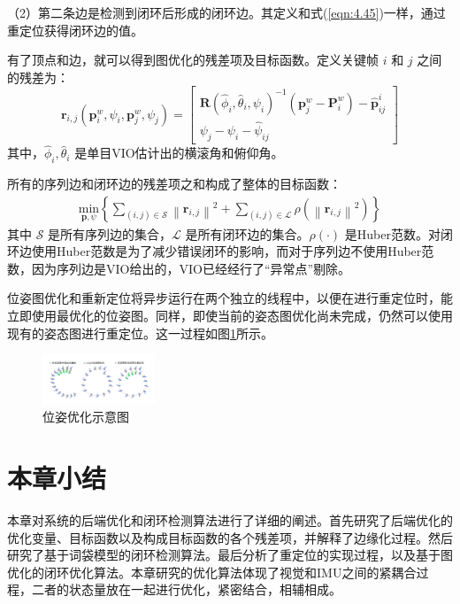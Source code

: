（2）第二条边是检测到闭环后形成的闭环边。其定义和式(\ref{eqn:4.45})一样，通过重定位获得闭环边的值。

有了顶点和边，就可以得到图优化的残差项及目标函数。定义关键帧 $i$ 和 $j$ 之间的残差为：
\begin{equation}
\label{eqn:4.46}
\mathbf{r}_{i,j}(\mathbf{p}_i^w,\psi_i,\mathbf{p}_j^w,\psi_j)=\begin{bmatrix}
\mathbf{R}(\hat{\phi}_i,\hat{\theta}_i,\psi_i)^{-1}(\mathbf{p}_j^w-\mathbf{P}_i^w)-\hat{\mathbf{p}}_{ij}^i \\
\psi_j-\psi_i-\hat{\psi}_{ij}
\end{bmatrix}
\end{equation}
其中，$\hat{\phi}_i,\hat{\theta}_i $ 是单目VIO估计出的横滚角和俯仰角。

所有的序列边和闭环边的残差项之和构成了整体的目标函数：
\begin{equation}
\label{eqn:4.47}
\begin{split}
\underset{\mathcal{\mathbf{p},\psi}}{\text{min}}
\left\{
\sum_{(i,j)\in\mathcal{S}}\left\| \mathbf{r}_{i,j} \right\|^2+\sum_{(i,j)\in\mathcal{L}}\rho(\left\| \mathbf{r}_{i,j} \right\|^2)
\right\}
\end{split}
\end{equation}
其中 $\mathcal{S} $ 是所有序列边的集合，$\mathcal{L} $ 是所有闭环边的集合。$\rho(\cdot) $  是Huber范数。对闭环边使用Huber范数是为了减少错误闭环的影响，而对于序列边不使用Huber范数，因为序列边是VIO给出的，VIO已经经行了“异常点”剔除。

位姿图优化和重新定位将异步运行在两个独立的线程中，以便在进行重定位时，能立即使用最优化的位姿图。同样，即使当前的姿态图优化尚未完成，仍然可以使用现有的姿态图进行重定位。这一过程如图\ref{fig4_9}所示。
\begin{figure}[h]\setlength{\belowcaptionskip}{-12pt}
	\centering
	\includegraphics[width=0.3\textwidth, angle=-90]{figures/chapter4/fig4_9}
	\caption{位姿优化示意图}\label{fig4_9}
\end{figure}
\section{本章小结}
本章对系统的后端优化和闭环检测算法进行了详细的阐述。首先研究了后端优化的优化变量、目标函数以及构成目标函数的各个残差项，并解释了边缘化过程。然后研究了基于词袋模型的闭环检测算法。最后分析了重定位的实现过程，以及基于图优化的闭环优化算法。本章研究的优化算法体现了视觉和IMU之间的紧耦合过程，二者的状态量放在一起进行优化，紧密结合，相辅相成。
